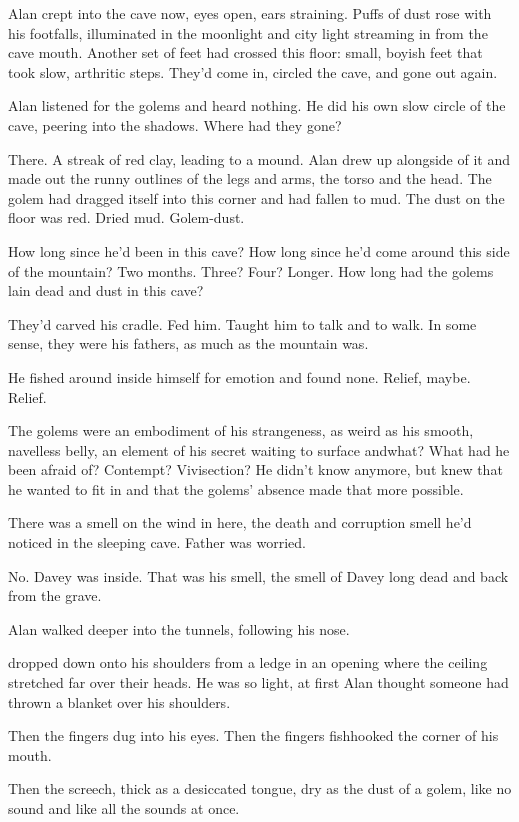 Alan crept into the cave now, eyes open, ears straining.  Puffs of
dust rose with his footfalls, illuminated in the moonlight and city
light streaming in from the cave mouth.  Another set of feet had
crossed this floor:  small, boyish feet that took slow, arthritic
steps.  They'd come in, circled the cave, and gone out again.

Alan listened for the golems and heard nothing.  He did his own slow
circle of the cave, peering into the shadows.  Where had they gone?

There.  A streak of red clay, leading to a mound.  Alan drew up
alongside of it and made out the runny outlines of the legs and arms,
the torso and the head.  The golem had dragged itself into this corner
and had fallen to mud.  The dust on the floor was red.  Dried mud. 
Golem-dust.

How long since he'd been in this cave?  How long since he'd come
around this side of the mountain?  Two months.  Three?  Four?  Longer. 
How long had the golems lain dead and dust in this cave?

They'd carved his cradle.  Fed him.  Taught him to talk and to walk. 
In some sense, they were his fathers, as much as the mountain was.

He fished around inside himself for emotion and found none.  Relief,
maybe.  Relief.

The golems were an embodiment of his strangeness, as weird as his
smooth, navelless belly, an element of his secret waiting to surface
and\dash{}what?  What had he been afraid of?  Contempt?  Vivisection?  He
didn't know anymore, but knew that he wanted to fit in and that the
golems' absence made that more possible.

There was a smell on the wind in here, the death and corruption smell
he'd noticed in the sleeping cave.  Father was worried.

No.  Davey was inside.  That was his smell, the smell of Davey long
dead and back from the grave.

Alan walked deeper into the tunnels, following his nose.

 dropped down onto his shoulders from a ledge in an opening where
the ceiling stretched far over their heads.  He was so light, at first
Alan thought someone had thrown a blanket over his shoulders.

Then the fingers dug into his eyes.  Then the fingers fishhooked the
corner of his mouth.

Then the screech, thick as a desiccated tongue, dry as the dust of a
golem, like no sound and like all the sounds at once.


